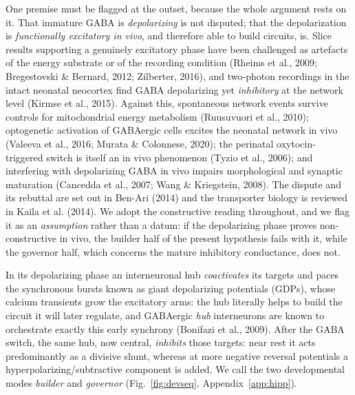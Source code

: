 \documentclass[11pt,a4paper]{article}
\begin{document}
One premise must be flagged at the outset, because the whole argument rests on it. That immature GABA is \emph{depolarizing} is not disputed; that the depolarization is \emph{functionally excitatory in vivo}, and therefore able to build circuits, is. Slice results supporting a genuinely excitatory phase have been challenged as artefacts of the energy substrate or of the recording condition (Rheims et al., 2009; Bregestovski \& Bernard, 2012; Zilberter, 2016), and two-photon recordings in the intact neonatal neocortex find GABA depolarizing yet \emph{inhibitory} at the network level (Kirmse et al., 2015). Against this, spontaneous network events survive controls for mitochondrial energy metabolism (Ruusuvuori et al., 2010); optogenetic activation of GABAergic cells excites the neonatal network in vivo (Valeeva et al., 2016; Murata \& Colonnese, 2020); the perinatal oxytocin-triggered switch is itself an in vivo phenomenon (Tyzio et al., 2006); and interfering with depolarizing GABA in vivo impairs morphological and synaptic maturation (Cancedda et al., 2007; Wang \& Kriegstein, 2008). The dispute and its rebuttal are set out in Ben-Ari (2014) and the transporter biology is reviewed in Kaila et al. (2014). We adopt the constructive reading throughout, and we flag it as an \emph{assumption} rather than a datum: if the depolarizing phase proves non-constructive in vivo, the builder half of the present hypothesis fails with it, while the governor half, which concerns the mature inhibitory conductance, does not.

In its depolarizing phase an interneuronal hub \emph{coactivates} its targets and paces the synchronous bursts known as giant depolarizing potentials (GDPs), whose calcium transients grow the excitatory arms: the hub literally helps to build the circuit it will later regulate, and GABAergic \emph{hub} interneurons are known to orchestrate exactly this early synchrony (Bonifazi et al., 2009). After the GABA switch, the same hub, now central, \emph{inhibits} those targets: near rest it acts predominantly as a divisive shunt, whereas at more negative reversal potentials a hyperpolarizing/subtractive component is added. We call the two developmental modes \emph{builder} and \emph{governor} (Fig.~\ref{fig:devseq}, Appendix~\ref{app:hipp}).
\end{document}
